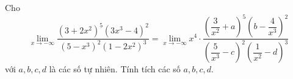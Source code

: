 \begin{ex}
Cho \[\lim\limits_{x\to-\infty}\dfrac{(3+2x^2)^5(3x^3-4)^2}{(5-x^3)^2(1-2x^2)^3}=\lim\limits_{x\to-\infty}x^4\cdot\dfrac{\left(\dfrac3{x^2}+a\right)^5\left(b-\dfrac4{x^3}\right)^2}{\left(\dfrac5{x^3}-c\right)^2\left(\dfrac1{x^2}-d\right)^3}\] với $a,b,c,d$ là các số tự nhiên. Tính tích các số $a,b,c,d$.
\end{ex}
